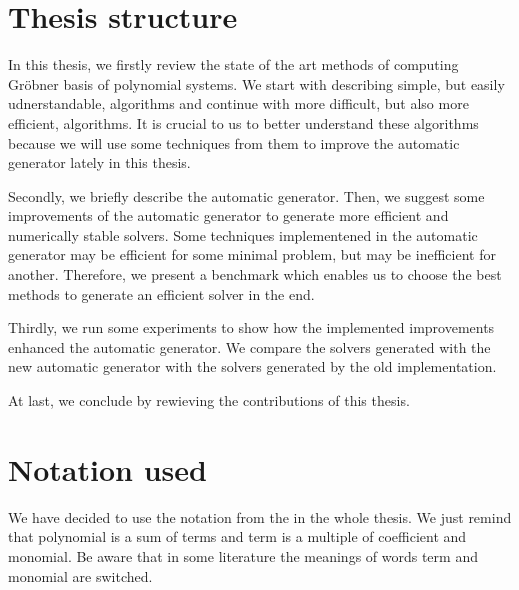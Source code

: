 \section{Thesis structure}
In this thesis, we firstly review the state of the art methods of computing Gr\"obner basis of polynomial systems. We start with describing simple, but easily udnerstandable, algorithms and continue with more difficult, but also more efficient, algorithms. It is crucial to us to better understand these algorithms because we will use some techniques from them to improve the automatic generator lately in this thesis.

Secondly, we briefly describe the automatic generator. Then, we suggest some improvements of the automatic generator to generate more efficient and numerically stable solvers. Some techniques implementened in the automatic generator may be efficient for some minimal problem, but may be inefficient for another. Therefore, we present a benchmark which enables us to choose the best methods to generate an efficient solver in the end.

Thirdly, we run some experiments to show how the implemented improvements enhanced the automatic generator. We compare the solvers generated with the new automatic generator with the solvers generated by the old implementation.

At last, we conclude by rewieving the contributions of this thesis.

\section{Notation used}
We have decided to use the notation from the \cite{Cox-Little-Shea97} in the whole thesis. We just remind that polynomial is a sum of terms and term is a multiple of coefficient and monomial. Be aware that in some literature \cite{Becker93, F4, F5} the meanings of words term and monomial are switched.
